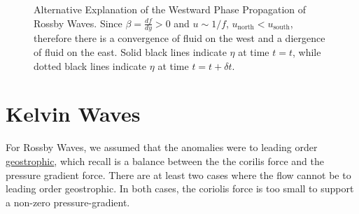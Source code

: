 \begin{figure}[H]
    \centering
    \caption{Alternative Explanation of the Westward Phase Propagation of Rossby Waves. Since \(\beta=\frac{df}{dy}>0\) and \(u\sim 1/f\), \(u_{\text{north}}<u_\text{south}\), therefore there is a convergence of fluid on the west and a diergence of fluid on the east. Solid black lines indicate \(\eta\) at time \(t=t\), while dotted black lines indicate \(\eta\) at time \(t=t+\delta t\).}
\end{figure}

\section{Kelvin Waves}\label{s Kelvin}

For Rossby Waves, we assumed that the anomalies were to leading order \hyperref[Geostrophic Box]{geostrophic}, which recall is a balance between the the corilis force and the pressure gradient force. There are at least two cases where the flow cannot be to leading order geostrophic. In both cases, the coriolis force is too small to support a non-zero pressure-gradient.

